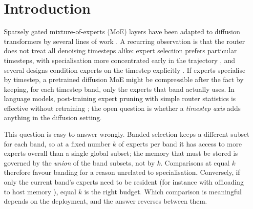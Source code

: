 \section{Introduction}\label{sec:intro}

Sparsely gated mixture-of-experts (MoE) layers \citep{shazeer2017moe} have been adapted to diffusion transformers by several lines of work \citep{fei2024ditmoe,park2024switchdit,shi2025diffmoe,yuan2025racedit,cheng2025diffmoe,wei2025promoe,liu2025dsmoe}.
A recurring observation is that the router does not treat all denoising timesteps alike: expert selection prefers particular timesteps, with specialisation more concentrated early in the trajectory \citep{fei2024ditmoe}, and several designs condition experts on the timestep explicitly \citep{cheng2025diffmoe,park2024switchdit}.
If experts specialise by timestep, a pretrained diffusion MoE might be compressible after the fact by keeping, for each timestep band, only the experts that band actually uses.
In language models, post-training expert pruning with simple router statistics is effective without retraining \citep{lu2024notallexperts,dong2025easyep,lasby2025reap,zhou2025dern}; the open question is whether a \emph{timestep axis} adds anything in the diffusion setting.

This question is easy to answer wrongly. Banded selection keeps a different subset for each band, so at a fixed number $k$ of experts per band it has access to more experts overall than a single global subset; the memory that must be stored is governed by the \emph{union} of the band subsets, not by $k$.
Comparisons at equal $k$ therefore favour banding for a reason unrelated to specialisation.
Conversely, if only the current band's experts need to be resident (for instance with offloading to host memory \citep{eliseev2023offloading,liang2026localrouting}), equal $k$ is the right budget.
Which comparison is meaningful depends on the deployment, and the answer reverses between them.

